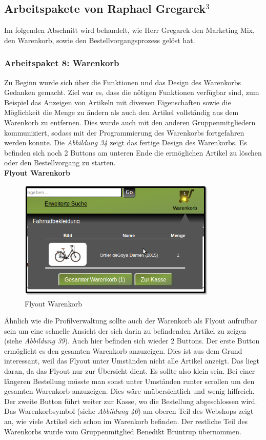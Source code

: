 \newpage
\subsection{Arbeitspakete von Raphael Gregarek$^3$}
Im folgenden Abschnitt wird behandelt, wie Herr Gregarek den Marketing Mix, den Warenkorb, sowie den Bestellvorgangsprozess gelöst hat.

\subsubsection{Arbeitspaket 8: Warenkorb}
Zu Beginn wurde sich über die Funktionen und das Design des Warenkorbs Gedanken gemacht. Ziel war es, dass die nötigen Funktionen verfügbar sind, zum Beispiel das Anzeigen von Artikeln mit diversen Eigenschaften sowie die Möglichkeit die Menge zu ändern als auch den Artikel vollständig aus dem Warenkorb zu entfernen. Dies wurde auch mit den anderen Gruppenmitgliedern kommuniziert, sodass mit der Programmierung des Warenkorbs fortgefahren werden konnte. Die \textit{Abbildung 34} zeigt das fertige Design des Warenkorbs. Es befinden sich noch 2 Buttons am unteren Ende die ermöglichen Artikel zu löschen oder den Bestellvorgang zu starten.\\

\textbf{Flyout Warenkorb}\\
\begin{figure}[H]
	\begin{center}
			\includegraphics[width=95mm]{Bilder/warenkorb_flyout.png}
	\end{center}
	\caption{Flyout Warenkorb}
\end{figure}

Ähnlich wie die Profilverwaltung sollte auch der Warenkorb als Flyout aufrufbar sein um eine schnelle Ansicht der sich darin zu befindenden Artikel zu zeigen (siehe \textit{Abbildung 39}). Auch hier befinden sich wieder 2 Buttons. Der erste Button ermöglicht es den gesamten Warenkorb anzuzeigen. Dies ist aus dem Grund interessant, weil das Flyout unter Umständen nicht alle Artikel anzeigt. Das liegt daran, da das Flyout nur zur Übersicht dient. Es sollte also klein sein. Bei einer längeren Bestellung müsste man sonst unter Umständen runter scrollen um den gesamten Warenkorb anzuzeigen. Dies wäre unübersichtlich und wenig hilfreich. Der zweite Button führt weiter zur Kasse, wo die Bestellung abgeschlossen wird. Das Warenkorbsymbol  (siehe \textit{Abbildung 40}) am oberen Teil des Webshops zeigt an, wie viele Artikel sich schon im Warenkorb befinden. Der restliche Teil des Warenkorbs wurde vom Gruppenmitglied Benedikt Brüntrup übernommen.

